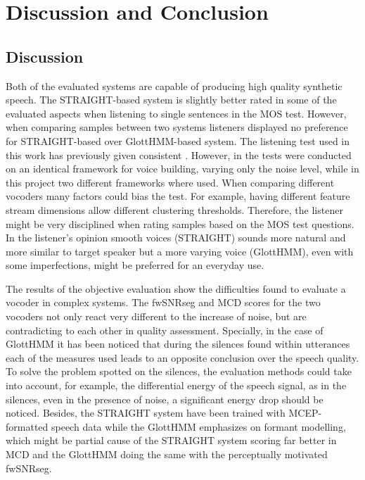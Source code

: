 \section{Discussion and Conclusion}
\label{conclusions}

\subsection{Discussion}
\label{conclusions_discussion}
Both of the evaluated systems are capable of producing high quality synthetic speech.
%
The STRAIGHT-based system is slightly better rated  in some of the evaluated aspects when listening to single sentences in the MOS test.
%
However, when comparing samples between two systems listeners displayed no preference for STRAIGHT-based over GlottHMM-based system.
%
The listening test used in this work has previously given consistent \cite{karhila_jstsp_14}.
%
However, in \cite{karhila_jstsp_14} the tests were conducted on an identical framework for voice building, varying only the noise level, while in this project two different frameworks where used.
%
When comparing different vocoders many factors could bias the test. For example, having different feature stream dimensions allow different clustering thresholds.
%
Therefore, the listener might be very disciplined when rating samples based on the MOS test questions.
%
In the listener's opinion smooth voices (STRAIGHT) sounds more natural and more similar to target speaker but a more varying voice (GlottHMM), even with some imperfections, might be preferred for an everyday use.

The results of the objective evaluation show the difficulties found to evaluate a vocoder in complex systems.
%
The fwSNRseg and MCD scores for the two vocoders not only react very different to the increase of noise, but are contradicting to each other in quality assessment.
%
Specially, in the case of GlottHMM it has been noticed that during the silences found within utterances each of the measures used leads to an opposite conclusion over the speech quality.
%
To solve the problem spotted on the silences, the evaluation methods could take into account, for example, the differential energy of the speech signal, as in the silences, even in the presence of noise, a significant energy drop should be noticed.
%
Besides, the STRAIGHT system have been trained with MCEP-formatted speech data while the GlottHMM emphasizes on formant modelling, which might be partial cause of the STRAIGHT system scoring far better in MCD and the GlottHMM doing the same with the perceptually motivated fwSNRseg.

